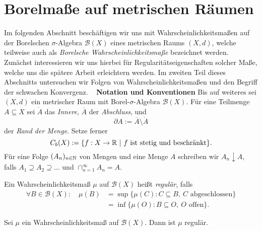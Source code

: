 \section{Borelmaße auf metrischen Räumen}
Im folgenden Abschnitt beschäftigen wir uns mit Wahrscheinlichkeitsmaßen auf der Borelschen $\sigma$-Algebra $\mathcal{B}(X)$ eines metrischen Raums $(X,d)$, 
welche teilweise auch als \textit{Borelsche Wahrscheinlichkeitsmaße} bezeichnet werden. 
Zunächst interessieren wir uns hierbei für Regularitätseigenschaften solcher Maße, welche uns die spätere Arbeit erleichtern werden. 
Im zweiten Teil dieses Abschnitts untersuchen wir Folgen von Wahrscheinlichkeitsmaßen und den Begriff der schwachen Konvergenz. 
\newline \ \newline 
\textbf{Notation und Konventionen} 
\newline
Bis auf weiteres sei $(X,d)$ ein metrischer Raum mit Borel-$\sigma$-Algebra $\mathcal{B}(X)$. 
Für eine Teilmenge $A \subseteq X$ sei $\mathring{A}$ das \textit{Innere}, $\overline{A}$ der \textit{Abschluss}, und 
$$
    \partial A := \overline{A} \setminus \mathring{A}
$$
der \textit{Rand der Menge}. 
Setze ferner 
$$
    C_b(X) := \{f:X \to \mathbb{R} \ | \ f \text{ ist stetig und beschränkt} \}.
$$ 
Für eine Folge $(A_n)_{n \in \mathbb{N}}$ von Mengen und eine Menge $A$ schreiben wir $A_n \downarrow A$, falls $A_1 \supseteq A_2 \supseteq ...$ und $\cap_{n=1}^{\infty}A_n = A$. 
\begin{mydef}
    Ein Wahrscheinlichkeitsmaß $\mu$ auf $\mathcal{B}(X)$ heißt \textit{regulär}, falls
    \begin{align*}
        \forall B \in \mathcal{B}(X): \quad \mu(B) &= \sup\{\mu(C): C \subseteq B, \ C \text{ abgeschlossen} \} \\\
                                                   &= \inf\{\mu(O): B \subseteq O, \ O \text{ offen} \}.  
    \end{align*}  
\end{mydef}

\begin{proposition}
    Sei $\mu$ ein Wahrscheinlichkeitsmaß auf $\mathcal{B}(X)$. Dann ist $\mu$ regulär. 
\end{proposition}

